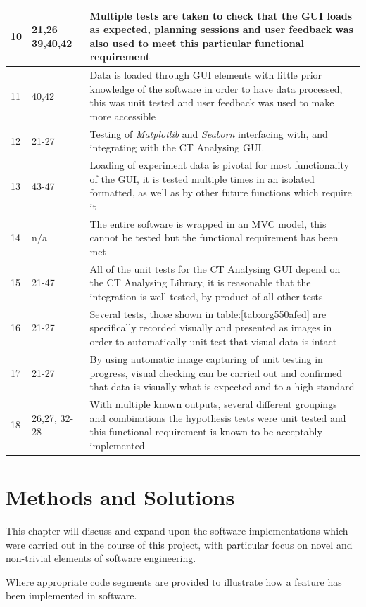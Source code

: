 \documentclass[11pt]{report}
\begin{document}
\begin{longtable}{|l|l|p{14cm}|}
\hline
10 & 21,26 39,40,42 & Multiple tests are taken to check that the GUI loads as expected, planning sessions and user feedback was also used to meet this particular functional requirement\\
\hline
11 & 40,42 & Data is loaded through GUI elements with little prior knowledge of the software in order to have data processed, this was unit tested and user feedback was used to make more accessible\\
\hline
12 & 21-27 & Testing of \emph{Matplotlib} and \emph{Seaborn} interfacing with, and integrating with the CT Analysing GUI.\\
\hline
13 & 43-47 & Loading of experiment data is pivotal for most functionality of the GUI, it is tested multiple times in an isolated formatted, as well as by other future functions which require it\\
\hline
14 & n/a & The entire software is wrapped in an MVC model, this cannot be tested but the functional requirement has been met\\
\hline
15 & 21-47 & All of the unit tests for the CT Analysing GUI depend on the CT Analysing Library, it is reasonable that the integration is well tested, by product of all other tests\\
\hline
16 & 21-27 & Several tests, those shown in table:\ref{tab:org550afed} are specifically recorded visually and presented as images in order to automatically unit test that visual data is intact\\
\hline
17 & 21-27 & By using automatic image capturing of unit testing in progress, visual checking can be carried out and confirmed that data is visually what is expected and to a high standard\\
\hline
18 & 26,27, 32-28 & With multiple known outputs, several different groupings and combinations the hypothesis tests were unit tested and this functional requirement is known to be acceptably implemented\\
\hline
\end{longtable}

\chapter{Methods and Solutions}
\label{sec:orgd9bfb58}
This chapter will discuss and expand upon the software implementations which were carried out in the course of this project, with particular focus on novel and non-trivial elements of software engineering.

Where appropriate code segments are provided to illustrate how a feature has been implemented in software.
\end{document}
